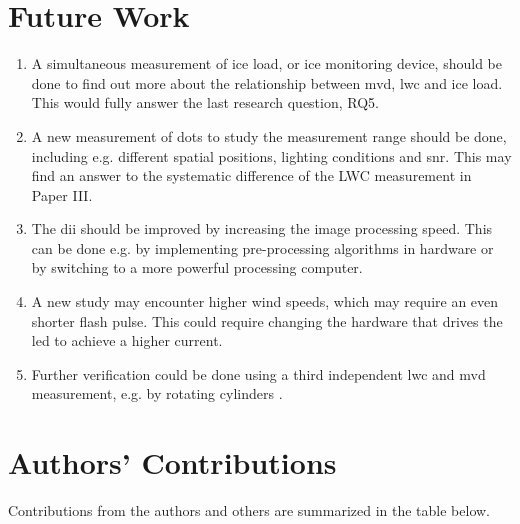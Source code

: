 \section{Future Work}
\label{sec:futurework}

\begin{enumerate}
\item A simultaneous measurement of ice load, or ice monitoring device, should be done to find out more about the relationship between \gls{mvd}, \gls{lwc} and ice load. This would fully answer the last research question, RQ5.
\item A new measurement of dots to study the measurement range should be done, including e.g. different spatial positions, lighting conditions and \gls{snr}. This may find an answer to the systematic difference of the LWC measurement in Paper III.
\item The \gls{dii} should be improved by increasing the image processing speed. This can be done e.g. by implementing pre-processing algorithms in hardware or by switching to a more powerful processing computer.
\item A new study may encounter higher wind speeds, which may require an even shorter flash pulse. This could require changing the hardware that drives the \gls{led} to achieve a higher current.
\item Further verification could be done using a third independent \gls{lwc} and \gls{mvd} measurement, e.g. by rotating cylinders \cite{makk1992}.
\end{enumerate}

\section{Authors' Contributions}

Contributions from the authors and others are summarized in the table below.

